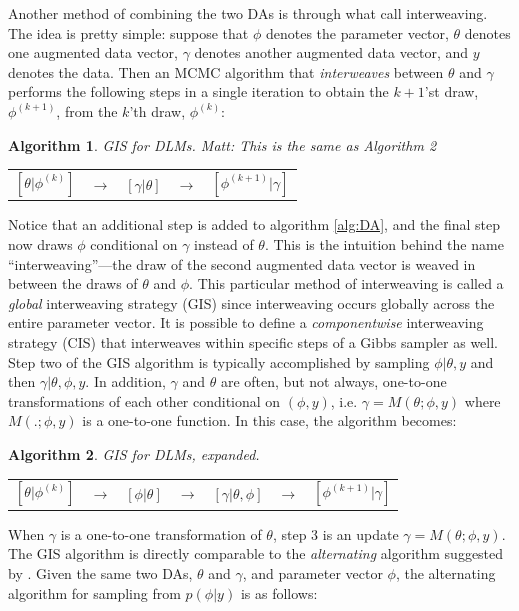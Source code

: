 \documentclass{article}
\newtheorem{alg}{Algorithm}
\newcommand{\matt}[1]{{\color{red} Matt: #1}}
\begin{document}
Another method of combining the two DAs is through what \citet{yu2011center} call interweaving. The idea is pretty simple: suppose that $\phi$ denotes the parameter vector, $\theta$ denotes one augmented data vector, $\gamma$ denotes another augmented data vector, and $y$ denotes the data. Then an MCMC algorithm that {\it interweaves} between $\theta$ and $\gamma$ performs the following steps in a single iteration to obtain the $k+1$'st draw, $\phi^{(k+1)}$, from the $k$'th draw, $\phi^{(k)}$: 
\begin{alg}GIS for DLMs.\label{alg:GIS} \matt{This is the same as Algorithm 2}\\
  \begin{center}
    \begin{tabular}{lllll}
      $[\theta|\phi^{(k)}]$& $\to$& $[\gamma|\theta]$& $\to$& $[\phi^{(k+1)}|\gamma]$
    \end{tabular}
  \end{center}
\end{alg}
Notice that an additional step is added to algorithm \ref{alg:DA}, and the final step now draws $\phi$ conditional on $\gamma$ instead of $\theta$. This is the intuition behind the name ``interweaving''---the draw of the second augmented data vector is weaved in between the draws of $\theta$ and $\phi$. This particular method of interweaving is called a {\it global} interweaving strategy (GIS) since interweaving occurs globally across the entire parameter vector. It is possible to define a {\it componentwise} interweaving strategy (CIS) that interweaves within specific steps of a Gibbs sampler as well. Step two of the GIS algorithm is typically accomplished by sampling $\phi|\theta,y$ and then $\gamma|\theta,\phi,y$. In addition, $\gamma$ and $\theta$ are often, but not always, one-to-one transformations of each other conditional on $(\phi,y)$, i.e. $\gamma = M(\theta;\phi,y)$ where $M(.;\phi,y)$ is a one-to-one function. In this case, the algorithm becomes:
\begin{alg}GIS for DLMs, expanded.\label{alg:GIS2}\\
  \begin{center}
    \begin{tabular}{lllllll}
      $[\theta|\phi^{(k)}]$& $\to$& $[\phi|\theta]$& $\to $&$[\gamma|\theta,\phi]$& $\to$& $[\phi^{(k+1)}|\gamma]$
    \end{tabular}
  \end{center}
\end{alg}
When $\gamma$ is a one-to-one transformation of $\theta$, step 3 is an update $\gamma=M(\theta;\phi,y)$. The GIS algorithm is directly comparable to the {\it alternating} algorithm suggested by \citet{papaspiliopoulos2007general}. Given the same two DAs, $\theta$ and $\gamma$, and parameter vector $\phi$, the alternating algorithm for sampling from $p(\phi|y)$ is as follows:
\end{document}
